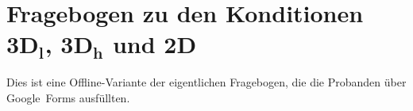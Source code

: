 \begin{appendices}
    \begin{center}
    \end{center}
    
    \section*{Fragebogen zu den Konditionen $\bm{3D_l}$, $\bm{3D_h}$ und $\bm{2D}$}
    \label{appendix:sus}
    Dies ist eine Offline-Variante der eigentlichen Fragebogen, die die Probanden über Google~Forms ausfüllten.
    

\end{appendices}

